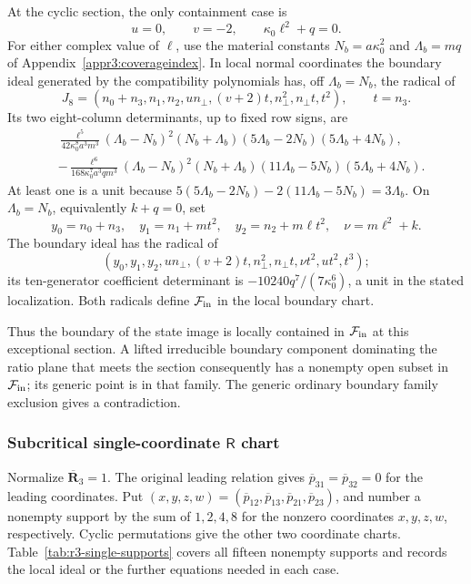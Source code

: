\documentclass[11pt,a4paper]{article}
\numberwithin{equation}{section}
\theoremstyle{plain}
\theoremstyle{definition}
\theoremstyle{remark}
\begin{document}
At the cyclic section, the only containment case is
\[
       u=0,\qquad v=-2,\qquad \kappa_0 \ell^2+q=0.
\]
For either complex value of $\ell$, use the material constants
$N_b=a\kappa_0^2$ and $\Lambda_b=mq$ of Appendix~\ref{appr3:coverageindex}. In local normal coordinates the
boundary ideal generated by the compatibility polynomials has, off $\Lambda_b=N_b$, the radical
of
\[
 J_8=(n_0+n_3,n_1,n_2,un_\perp,(v+2)t,n_\perp^2,n_\perp t,t^2),
 \qquad t=n_3.
\]
Its two eight-column determinants, up to fixed row signs, are
\begin{align*}
 &\frac{\ell^5}{42\kappa_0 ^8a^3m^3}
  (\Lambda_b-N_b)^2(N_b+\Lambda_b)
  (5\Lambda_b-2N_b)(5\Lambda_b+4N_b),\\
 &-\frac{\ell^6}{168\kappa_0 ^7a^3qm^3}
  (\Lambda_b-N_b)^2(N_b+\Lambda_b)
  (11\Lambda_b-5N_b)(5\Lambda_b+4N_b).
\end{align*}
At least one is a unit because
$5(5\Lambda_b-2N_b)-2(11\Lambda_b-5N_b)=3\Lambda_b$.
On $\Lambda_b=N_b$, equivalently $k+q=0$, set
\[
 y_0=n_0+n_3,\quad y_1=n_1+mt^2,\quad
 y_2=n_2+m\ell t^2,\quad \nu=m\ell^2+k .
\]
The boundary ideal has the radical of
\[
 (y_0,y_1,y_2,un_\perp,(v+2)t,n_\perp^2,n_\perp t,\nu t^2,ut^2,t^3);
\]
its ten-generator coefficient determinant is
$-10240q^7/(7\kappa_0 ^6)$, a unit in the stated localization. Both radicals define
$\mathcal F_{\rm in}$ in the local boundary chart.

Thus the boundary of the state image is locally contained in
$\mathcal F_{\rm in}$ at this exceptional section. A lifted
irreducible boundary component dominating the ratio plane that meets
the section consequently has a nonempty open subset in
$\mathcal F_{\rm in}$; its generic point is in that family. The
generic ordinary boundary family exclusion gives a contradiction.

\subsubsection{Subcritical single-coordinate $\mathsf R$ chart}\label{r3:single-supports}

Normalize $\overline{\boldsymbol R}_3=1$. The original leading relation gives $\overline p_{31}=\overline p_{32}=0$ for the leading coordinates. Put $(x,y,z,w)=(\overline p_{12},\overline p_{13},\overline p_{21},\overline p_{23})$, and number a nonempty support by the sum of $1,2,4,8$ for the nonzero coordinates $x,y,z,w$, respectively. Cyclic permutations give the other two coordinate charts.
Table~\ref{tab:r3-single-supports} covers all fifteen nonempty supports
and records the local ideal or the further equations needed in each case.
\end{document}
